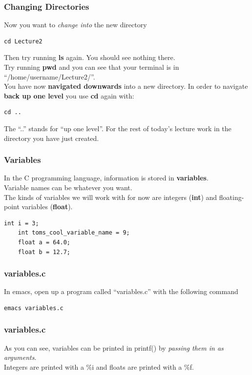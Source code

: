 \documentclass{beamer}
\begin{document}
\begin{frame}[fragile]
  \frametitle{Changing Directories}
  Now you want to \textit{change into} the new directory
  \begin{lstlisting}[style=custombash]
    cd Lecture2
  \end{lstlisting}
  Then try running \textbf{ls} again. You should see nothing there.\\
  Try running \textbf{pwd} and you can see that your terminal is 
  in ``/home/username/Lecture2/''.\\
  You have now \textbf{navigated downwards} into a new directory. 
  In order to navigate 
  \textbf{back up one level} you use \textbf{cd} again with:
  \begin{lstlisting}[style=custombash]
    cd ..
  \end{lstlisting}
  The ``..'' stands for ``up one level''. 
  For the rest of today's lecture work in the directory you have just created.
\end{frame}

\begin{frame}[fragile]
  \frametitle{Variables}
  In the C programming language, information is stored in \textbf{variables}.\\
  Variable names can be whatever you want.\\
  The kinds of variables we will work with for now are integers (\textbf{int}) and
  floating-point variables (\textbf{float}).
  \begin{lstlisting}[style=customc]
    int i = 3;
    int toms_cool_variable_name = 9;
    float a = 64.0;
    float b = 12.7;
  \end{lstlisting}
\end{frame}

\begin{frame}[fragile]
  \frametitle{variables.c}
  In emacs, open up a program called ``variables.c'' with the following command
  \begin{lstlisting}[style=custombash]
    emacs variables.c
  \end{lstlisting}
\end{frame}

\begin{frame}[fragile]
  \frametitle{variables.c}
  
  As you can see, variables can be printed in printf() 
  by \textit{passing them in as arguments}.\\
  Integers are printed with a \%i and floats are printed with a \%f.
\end{frame}
\end{document}
